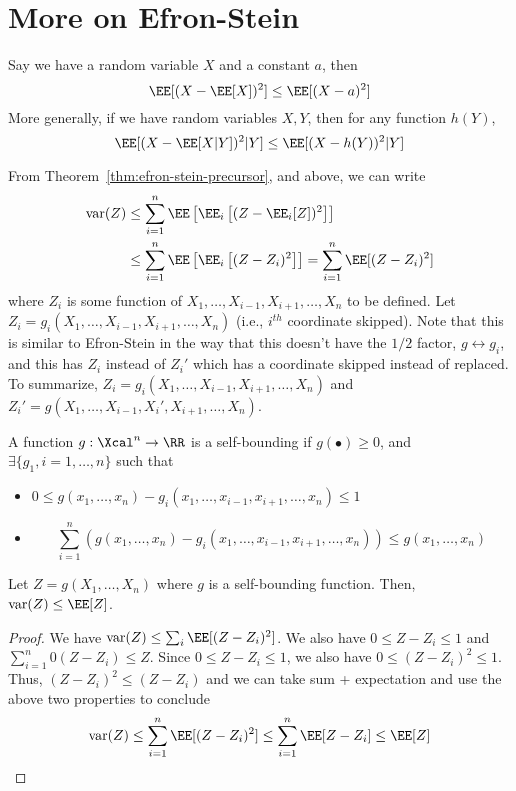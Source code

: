 \chapter{More on Efron-Stein}
\begin{remark}
Say we have a random variable $X$ and a constant $a$, then
\[
\EE[(X- \EE[X])^2] \leq \EE[(X-a)^2]
\]
More generally, if we have random variables $X, Y$, then for any function $h(Y)$, 
\[\EE[(X - \EE[X|Y])^2 | Y] \leq \EE[(X - h(Y))^2 | Y]\]
\end{remark}

From Theorem~\ref{thm:efron-stein-precursor}, and above, we can write
\begin{align*}
    \text{var}(Z) &\leq \sum_{i=1}^n \EE\left[\EE_i\left[(Z - \EE_i[Z])^2\right]\right] \\ 
    &\leq \sum_{i=1}^n \EE\left[\EE_i\left[(Z - Z_i)^2\right]\right]  = \sum_{i=1}^n \EE[(Z - Z_i)^2]
\end{align*}
where $Z_i$ is some function of $X_1, \dots, X_{i-1}, X_{i+1}, \dots, X_n$ to be defined. Let $Z_i = g_i(X_1, \dots, X_{i-1}, X_{i+1}, \dots, X_n)$ (i.e., $i^{th}$ coordinate skipped). Note that this is similar to Efron-Stein in the way that this doesn't have the $1/2$ factor, $g \leftrightarrow g_i$, and this has $Z_i$ instead of $Z_i'$ which has a coordinate skipped instead of replaced. To summarize, $Z_i = g_i(X_1, \dots, X_{i-1}, X_{i+1}, \dots, X_n)$ and $Z_i' = g(X_1, \dots, X_{i-1}, X_i', X_{i+1}, \dots, X_n)$.
\begin{definition}
A function $g: \Xcal^n \to \RR$ is a self-bounding if $g(\bullet) \geq 0$, and $\exists \{g_1, i=1,\dots, n\}$ such that 
\begin{itemize}
    \item[\circled{1}] $0 \leq g(x_1, \dots, x_n) - g_i(x_1, \dots, x_{i-1}, x_{i+1}, \dots, x_n) \leq 1$ 
    \item[\circled{2}] 
    \[
    \sum_{i=1}^n \left(g(x_1, \dots, x_n) - g_i(x_1,\dots,x_{i-1},x_{i+1},\dots,x_n)\right) \leq g(x_1, \dots, x_n)
    \]
\end{itemize}
\end{definition}
\begin{corollary}
Let $Z = g(X_1, \dots, X_n)$ where $g$ is a self-bounding function. Then, $\text{var}(Z) \leq \EE[Z]$.
\end{corollary}
\begin{proof}
We have $\text{var}(Z) \leq \sum_i \EE[(Z - Z_i)^2]$. We also have $0 \leq Z -Z_i \leq 1$ and $\sum_{i=1}^n 0 (Z-Z_i) \leq Z$. Since $0\leq Z-Z_i\leq 1$, we also have $0 \leq (Z - Z_i)^2 \leq 1$. Thus, $(Z - Z_i)^2 \leq (Z-Z_i)$ and we can take sum + expectation and use the above two properties to conclude
\[
\text{var}(Z) \leq \sum_{i=1}^n \EE[(Z - Z_i)^2] \leq \sum_{i=1}^n \EE[Z-Z_i] \leq \EE[Z]
\]
\end{proof}
